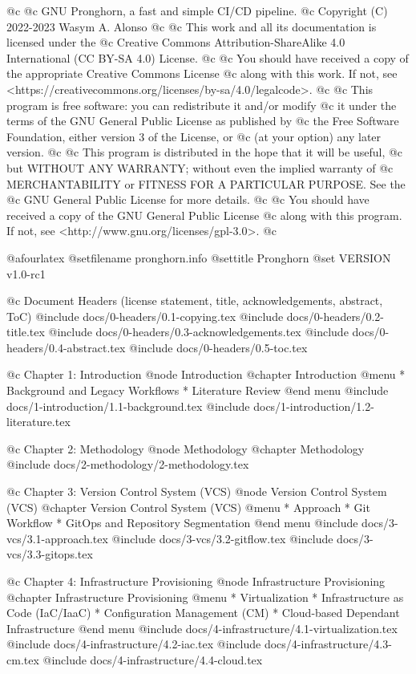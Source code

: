 


@c
@c GNU Pronghorn, a fast and simple CI/CD pipeline.
@c Copyright (C) 2022-2023 Wasym A. Alonso
@c
@c This work and all its documentation is licensed under the
@c Creative Commons Attribution-ShareAlike 4.0 International (CC BY-SA 4.0) License.
@c
@c You should have received a copy of the appropriate Creative Commons License
@c along with this work. If not, see <https://creativecommons.org/licenses/by-sa/4.0/legalcode>.
@c
@c This program is free software: you can redistribute it and/or modify
@c it under the terms of the GNU General Public License as published by
@c the Free Software Foundation, either version 3 of the License, or
@c (at your option) any later version.
@c
@c This program is distributed in the hope that it will be useful,
@c but WITHOUT ANY WARRANTY; without even the implied warranty of
@c MERCHANTABILITY or FITNESS FOR A PARTICULAR PURPOSE. See the
@c GNU General Public License for more details.
@c
@c You should have received a copy of the GNU General Public License
@c along with this program. If not, see <http://www.gnu.org/licenses/gpl-3.0>.
@c


@afourlatex
@setfilename pronghorn.info
@settitle Pronghorn
@set VERSION v1.0-rc1


@c Document Headers (license statement, title, acknowledgements, abstract, ToC)
@include docs/0-headers/0.1-copying.tex
@include docs/0-headers/0.2-title.tex
@include docs/0-headers/0.3-acknowledgements.tex
@include docs/0-headers/0.4-abstract.tex
@include docs/0-headers/0.5-toc.tex


@c Chapter 1: Introduction
@node Introduction
@chapter Introduction
@menu
* Background and Legacy Workflows
* Literature Review
@end menu
@include docs/1-introduction/1.1-background.tex
@include docs/1-introduction/1.2-literature.tex

@c Chapter 2: Methodology
@node Methodology
@chapter Methodology
@include docs/2-methodology/2-methodology.tex

@c Chapter 3: Version Control System (VCS)
@node Version Control System (VCS)
@chapter Version Control System (VCS)
@menu
* Approach
* Git Workflow
* GitOps and Repository Segmentation
@end menu
@include docs/3-vcs/3.1-approach.tex
@include docs/3-vcs/3.2-gitflow.tex
@include docs/3-vcs/3.3-gitops.tex

@c Chapter 4: Infrastructure Provisioning
@node Infrastructure Provisioning
@chapter Infrastructure Provisioning
@menu
* Virtualization
* Infrastructure as Code (IaC/IaaC)
* Configuration Management (CM)
* Cloud-based Dependant Infrastructure
@end menu
@include docs/4-infrastructure/4.1-virtualization.tex
@include docs/4-infrastructure/4.2-iac.tex
@include docs/4-infrastructure/4.3-cm.tex
@include docs/4-infrastructure/4.4-cloud.tex

